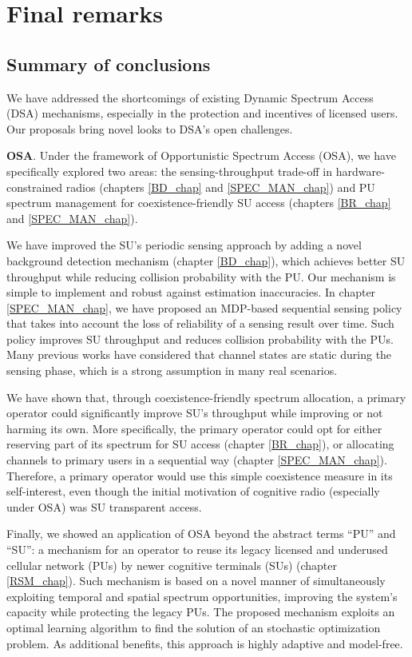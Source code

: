 \chapter{Final remarks}\label{Conclusion_chap}

\section{Summary of conclusions} %

We have addressed the shortcomings of existing Dynamic Spectrum Access (DSA) mechanisms, especially in the protection and incentives of licensed users. Our proposals bring novel looks to DSA's open challenges. 

\textbf{OSA}. Under the framework of Opportunistic Spectrum Access (OSA), we have specifically explored two areas: the sensing-throughput trade-off in hardware-constrained radios (chapters \ref{BD_chap} and \ref{SPEC_MAN_chap}) and PU spectrum management for coexistence-friendly SU access (chapters \ref{BR_chap} and \ref{SPEC_MAN_chap}). 

We have improved the SU's periodic sensing approach by adding a novel background detection mechanism (chapter \ref{BD_chap}), which achieves better SU throughput while reducing collision probability with the PU. Our mechanism is simple to implement and robust against estimation inaccuracies. In chapter \ref{SPEC_MAN_chap}, we have proposed an MDP-based sequential sensing policy that takes into account the loss of reliability of a sensing result over time. Such policy improves SU throughput and reduces collision probability with the PUs. Many previous works have considered that channel states are static during the sensing phase, which is a strong assumption in many real scenarios. 

We have shown that, through coexistence-friendly spectrum allocation, a primary operator could significantly improve SU's throughput while improving or not harming its own. More specifically, the primary operator could opt for either reserving part of its spectrum for SU access (chapter \ref{BR_chap}), or allocating channels to primary users in a sequential way (chapter \ref{SPEC_MAN_chap}). 
Therefore, a primary operator would use this simple coexistence measure in its self-interest, even though the initial motivation of cognitive radio (especially under OSA) was SU transparent access. 

Finally, we showed an application of OSA beyond the abstract terms \enquote{PU} and \enquote{SU}: a mechanism for an operator to reuse its legacy licensed and underused cellular network (PUs) by newer cognitive terminals (SUs) (chapter \ref{RSM_chap}). Such mechanism is based on a novel manner of simultaneously exploiting temporal and spatial spectrum opportunities, improving the system's capacity while protecting the legacy PUs. The proposed mechanism exploits an optimal learning algorithm to find the solution of an stochastic optimization problem. As additional benefits, this approach is highly adaptive and model-free.

